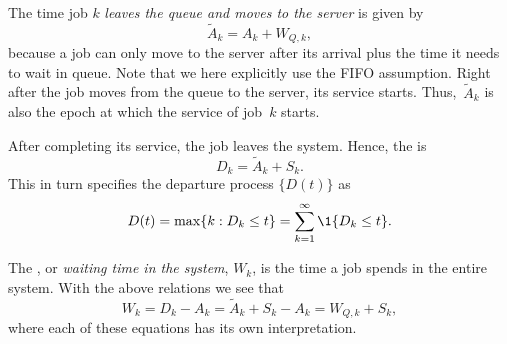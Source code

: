 The time job $k$ \emph{leaves the queue and moves to the server} is given by
\begin{equation*}
 \tilde A_k = A_k + W_{Q,k},
\end{equation*}
because a job can only move to the server after its arrival plus the time it needs to wait in queue.
Note that we here explicitly use the FIFO assumption.
Right after the job moves from the queue to the server, its service starts.
Thus,~$\tilde A_{k}$ is also the epoch at which the service of job~$k$ starts.

After completing its service, the job leaves the system.
Hence, the  is
\begin{equation*}
 D_k = \tilde A_{k} + S_k.
\end{equation*}
This in turn specifies the departure process $\{D(t)\}$ as
\begin{equation*}
 D(t) = \max\{k : D_k \leq t\} = \sum_{k=1}^\infty \1{D_k \leq t}.
\end{equation*}



The , or \emph{waiting time in the system}, $W_k$, is the time a job spends in the entire system.
With the above relations we see that
\begin{equation}
 W_k = D_k - A_k = \tilde A_{k} + S_k -A_k = W_{Q,k} + S_k,
\end{equation}
where each of these equations has its own interpretation. 


